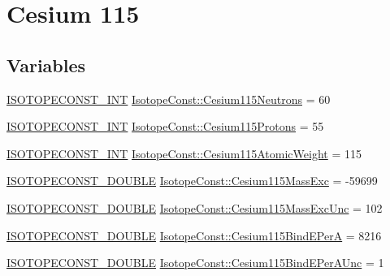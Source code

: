 \hypertarget{group___isotope_const-_cesium-_cs115}{}\section{Cesium 115}
\label{group___isotope_const-_cesium-_cs115}
\subsection*{Variables}
\begin{DoxyCompactItemize}
\item 
\mbox{\hyperlink{group___isotope_const-_macros_ga5f18360b3e99483a35c32d789e62621c}{I\+S\+O\+T\+O\+P\+E\+C\+O\+N\+S\+T\+\_\+\+I\+NT}} \mbox{\hyperlink{group___isotope_const-_cesium-_cs115_ga1767f5b75e5a37454468b3d881a4dfa9}{Isotope\+Const\+::\+Cesium115\+Neutrons}} = 60
\item 
\mbox{\hyperlink{group___isotope_const-_macros_ga5f18360b3e99483a35c32d789e62621c}{I\+S\+O\+T\+O\+P\+E\+C\+O\+N\+S\+T\+\_\+\+I\+NT}} \mbox{\hyperlink{group___isotope_const-_cesium-_cs115_ga8c7ed23c6beb2b226ffbdd921d7bddd7}{Isotope\+Const\+::\+Cesium115\+Protons}} = 55
\item 
\mbox{\hyperlink{group___isotope_const-_macros_ga5f18360b3e99483a35c32d789e62621c}{I\+S\+O\+T\+O\+P\+E\+C\+O\+N\+S\+T\+\_\+\+I\+NT}} \mbox{\hyperlink{group___isotope_const-_cesium-_cs115_ga15567801948a6622030123c0f74fb946}{Isotope\+Const\+::\+Cesium115\+Atomic\+Weight}} = 115
\item 
\mbox{\hyperlink{group___isotope_const-_macros_ga8f45a7272ce02c0b4c65c44636ed719a}{I\+S\+O\+T\+O\+P\+E\+C\+O\+N\+S\+T\+\_\+\+D\+O\+U\+B\+LE}} \mbox{\hyperlink{group___isotope_const-_cesium-_cs115_gac6723f5828b28d88127017d5474d78be}{Isotope\+Const\+::\+Cesium115\+Mass\+Exc}} = -\/59699
\item 
\mbox{\hyperlink{group___isotope_const-_macros_ga8f45a7272ce02c0b4c65c44636ed719a}{I\+S\+O\+T\+O\+P\+E\+C\+O\+N\+S\+T\+\_\+\+D\+O\+U\+B\+LE}} \mbox{\hyperlink{group___isotope_const-_cesium-_cs115_gaa8010a53214159115bd02eaee63b4622}{Isotope\+Const\+::\+Cesium115\+Mass\+Exc\+Unc}} = 102
\item 
\mbox{\hyperlink{group___isotope_const-_macros_ga8f45a7272ce02c0b4c65c44636ed719a}{I\+S\+O\+T\+O\+P\+E\+C\+O\+N\+S\+T\+\_\+\+D\+O\+U\+B\+LE}} \mbox{\hyperlink{group___isotope_const-_cesium-_cs115_ga28a34d9fb4561d339d74c39de166f154}{Isotope\+Const\+::\+Cesium115\+Bind\+E\+PerA}} = 8216
\item 
\mbox{\hyperlink{group___isotope_const-_macros_ga8f45a7272ce02c0b4c65c44636ed719a}{I\+S\+O\+T\+O\+P\+E\+C\+O\+N\+S\+T\+\_\+\+D\+O\+U\+B\+LE}} \mbox{\hyperlink{group___isotope_const-_cesium-_cs115_ga0aff37923ddf454bf608608534077f78}{Isotope\+Const\+::\+Cesium115\+Bind\+E\+Per\+A\+Unc}} = 1

\end{DoxyCompactItemize}
